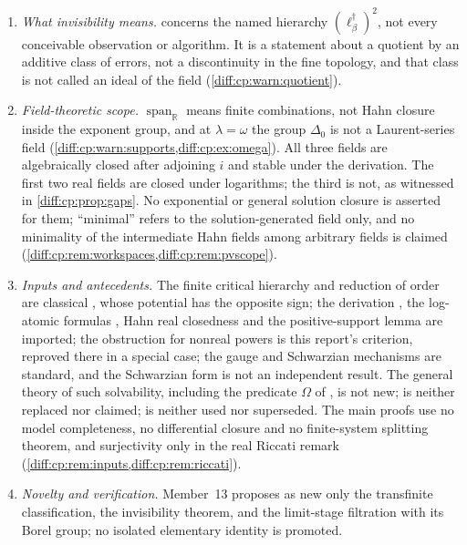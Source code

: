 \documentclass[11pt,letterpaper]{article}
\numberwithin{equation}{section}
\theoremstyle{definition}
\theoremstyle{remark}
\newcommand{\R}{\mathbb R}
\newcommand{\Span}{\operatorname{span}}
\begin{document}
\begin{enumerate}[label=\textup{N\arabic*.},leftmargin=3.0em,itemsep=0.35em,start=95]
$\varepsilon\prec(\ell_{\alpha}^{\dagger})^{2}$ preserves subcritical or
supercritical behaviour is not proved and would need further differential
asymptotic estimates, and at $c=\frac14$ a smaller perturbation can matter
(\cref{diff:cp:rem:notarbitrary}).
\item \emph{What invisibility means.}  concerns the
named hierarchy $(\ell_{\beta}^{\dagger})^{2}$, not every conceivable
observation or algorithm. It is a statement about a quotient by an additive
class of errors, not a discontinuity in the fine topology, and that class is
not called an ideal of the field (\cref{diff:cp:warn:quotient}).
\item \emph{Field-theoretic scope.} $\Span_{\R}$ means finite combinations, not
Hahn closure inside the exponent group, and at $\lambda=\omega$ the group
$\Delta_{0}$ is not a Laurent-series field (\cref{diff:cp:warn:supports,diff:cp:ex:omega}).
All three fields are algebraically closed after adjoining $i$ and
stable under the derivation. The first two real fields are closed
under logarithms; the third is not, as witnessed in
\cref{diff:cp:prop:gaps}. No exponential or general solution closure
is asserted for them;
``minimal'' refers to the solution-generated field only, and no minimality of
the intermediate Hahn fields among arbitrary fields is claimed
(\cref{diff:cp:rem:workspaces,diff:cp:rem:pvscope}).
\item \emph{Inputs and antecedents.} The finite critical hierarchy and
reduction of order are classical \cite{KT}, whose potential has the opposite
sign; the derivation \cite{BM}, the log-atomic formulas \cite{ADH}, Hahn real
closedness and the positive-support lemma are imported; the obstruction for
nonreal powers is this report's criterion, reproved there in a special case;
the gauge and Schwarzian mechanisms are standard, and the Schwarzian form is
not an independent result. The general theory of such solvability, including
the predicate $\Omega$ of \cite[p.~17]{ADH}, is not new; \cite{ADHBook} is
neither replaced nor claimed; \cite{Mantova2026} is neither used nor
superseded. The main proofs use no model completeness, no differential closure
and no finite-system splitting theorem, and surjectivity only in the real
Riccati remark (\cref{diff:cp:rem:inputs,diff:cp:rem:riccati}).
\item \emph{Novelty and verification.} Member~13 proposes as new only the
transfinite classification, the invisibility theorem, and the limit-stage
filtration with its Borel group; no isolated elementary identity is promoted.

\end{enumerate}
\end{document}
